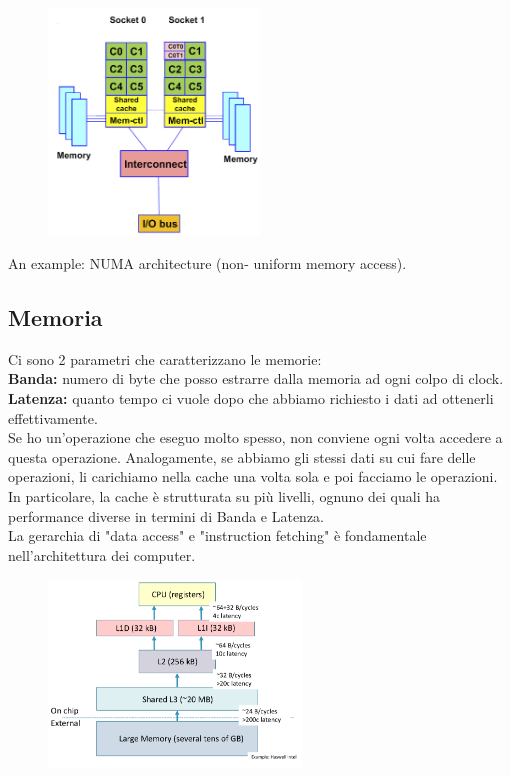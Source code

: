 \begin{figure}[ht]
    \centering
    \includegraphics[width=0.5\textwidth]{figure_parallel/server.png}
\end{figure}
\FloatBarrier

An example: NUMA architecture (non-
uniform memory access).

\subsection{Memoria}
Ci sono 2 parametri che caratterizzano le memorie:\\ 
\textbf{Banda:} numero di byte che posso estrarre dalla memoria ad ogni colpo di clock.\\
\textbf{Latenza:} quanto tempo ci vuole dopo che abbiamo richiesto i dati ad ottenerli effettivamente.\\

Se ho un'operazione che eseguo molto spesso, non conviene ogni volta accedere a questa operazione.
Analogamente, se abbiamo gli stessi dati su cui fare delle operazioni, li carichiamo nella cache una volta sola e poi facciamo le operazioni.\\

In particolare, la cache è strutturata su più livelli, ognuno dei quali ha performance diverse in termini di Banda e Latenza.\\
La gerarchia di "data access" e "instruction fetching" è fondamentale nell'architettura dei computer.\\

\begin{figure}[ht]
    \centering
    \includegraphics[width=0.6\textwidth]{figure_parallel/cache.png}
\end{figure}
\FloatBarrier

